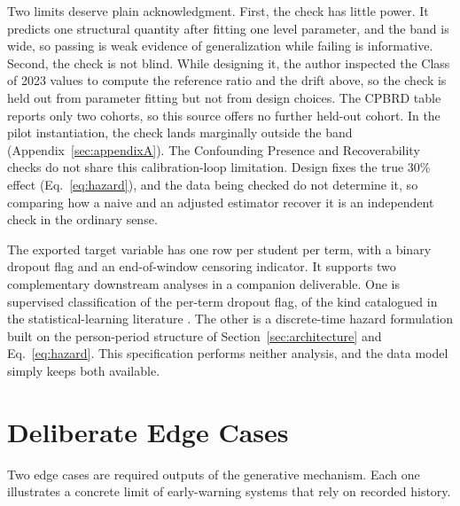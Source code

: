 \documentclass[11pt]{article}
\begin{document}
Two limits deserve plain acknowledgment. First, the check has little power. It predicts one structural quantity after fitting one level parameter, and the band is wide, so passing is weak evidence of generalization while failing is informative. Second, the check is not blind. While designing it, the author inspected the Class of 2023 values to compute the reference ratio and the drift above, so the check is held out from parameter fitting but not from design choices. The CPBRD table reports only two cohorts, so this source offers no further held-out cohort. In the pilot instantiation, the check lands marginally outside the band (Appendix~\ref{sec:appendixA}). The Confounding Presence and Recoverability checks do not share this calibration-loop limitation. Design fixes the true 30\% effect (Eq.~\ref{eq:hazard}), and the data being checked do not determine it, so comparing how a naive and an adjusted estimator recover it is an independent check in the ordinary sense.

The exported target variable has one row per student per term, with a binary dropout flag and an end-of-window censoring indicator. It supports two complementary downstream analyses in a companion deliverable. One is supervised classification of the per-term dropout flag, of the kind catalogued in the statistical-learning literature \citep{james2013}. The other is a discrete-time hazard formulation built on the person-period structure of Section~\ref{sec:architecture} and Eq.~\ref{eq:hazard}. This specification performs neither analysis, and the data model simply keeps both available.

\FloatBarrier
\section{Deliberate Edge Cases}
\label{sec:edgecases}

\hspace*{\parindent}Two edge cases are required outputs of the generative mechanism. Each one illustrates a concrete limit of early-warning systems that rely on recorded history.
\end{document}
